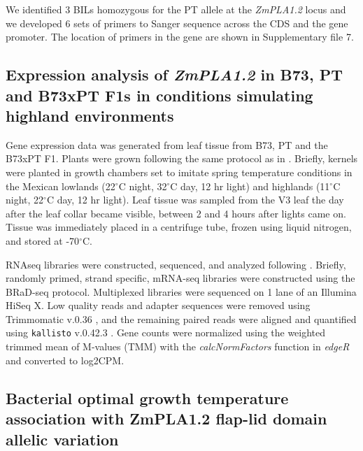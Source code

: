 \documentclass[9pt,twocolumn,twoside,lineno]{BioRxiv}
\begin{document}
We identified 3 BILs homozygous for the PT allele at the \textit{ZmPLA1.2} locus and we developed 6 sets of primers to Sanger sequence across the CDS and the gene promoter. 
The location of primers in the gene are shown in Supplementary file 7. 

\subsection{Expression analysis of \textit{ZmPLA1.2} in B73, PT and B73xPT F1s in conditions simulating highland environments}

Gene expression data was generated from leaf tissue from B73, PT and the B73xPT F1. 
Plants were grown following the same protocol as in \cite{Crow2020-gene}.
Briefly, kernels were planted in growth chambers set to imitate spring temperature conditions in the Mexican lowlands (22$^{\circ}$C night, 32$^{\circ}$C day, 12 hr light) and highlands (11$^{\circ}$C night, 22$^{\circ}$C day, 12 hr light). 
Leaf tissue was sampled from the V3 leaf the day after the leaf collar became visible, between 2 and 4 hours after lights came on. Tissue was immediately placed in a centrifuge tube, frozen using liquid nitrogen, and stored at -70$^{\circ}$C.

RNAseq libraries were constructed, sequenced, and analyzed following \cite{Crow2020-gene}. 
Briefly, randomly primed, strand specific, mRNA-seq libraries were constructed using the BRaD-seq \cite{townsley2015brad} protocol.
Multiplexed libraries were sequenced on 1 lane of an Illumina HiSeq X. 
Low quality reads and adapter sequences were removed using Trimmomatic v.0.36 \cite{bolger2014trimmomatic}, and the remaining paired reads were aligned and quantified using \texttt{kallisto} v.0.42.3 \cite{bray2016near}. 
Gene counts were normalized using the weighted trimmed mean of M-values (TMM) with the \textit{calcNormFactors} function in \textit{edgeR} \cite{robinson2010edger} and converted to log2CPM.

\subsection{Bacterial optimal growth temperature association with ZmPLA1.2 flap-lid domain allelic variation}
\end{document}
